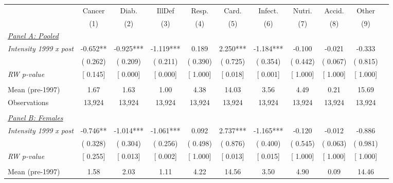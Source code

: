 \begin{tabular}{lcccccccccc} \hline \hline
& Cancer & Diab. & IllDef & Resp. & Card. & Infect. & Nutri. & Accid. & Other \\ 
\cmidrule(lr){2-2}\cmidrule(lr){3-3}\cmidrule(lr){4-4}\cmidrule(lr){5-5}\cmidrule(lr){6-6}\cmidrule(lr){7-7}\cmidrule(lr){8-8}\cmidrule(lr){9-9}\cmidrule(lr){10-10}
& \multicolumn{1}{c}{(1)} & \multicolumn{1}{c}{(2)} & \multicolumn{1}{c}{(3)} & \multicolumn{1}{c}{(4)} & \multicolumn{1}{c}{(5)} & \multicolumn{1}{c}{(6)} & \multicolumn{1}{c}{(7)} & \multicolumn{1}{c}{(8)} & \multicolumn{1}{c}{(9)} \\ \toprule
\underline{\textit{Panel A: Pooled}}  \\ 
\textit{Intensity 1999 x post} &       -0.652** &       -0.925*** &       -1.119*** &        0.189 &        2.250*** &       -1.184*** &       -0.100 &       -0.021 &       -0.333 \\ 
 & (       0.262) & (       0.209) & (       0.211) & (       0.390) & (       0.725) & (       0.354) & (       0.442) & (       0.067) & (       0.815) \\ 
\textit{RW p-value} & [ 0.145] & [ 0.000] & [ 0.000] & [ 1.000] & [ 0.018] & [ 0.001] & [ 1.000] & [ 1.000] & [ 1.000] \\ 
  & & & & & & & & & \\ 
Mean (pre-1997) &         1.67 &         1.63 &         1.00 &         4.38 &        14.03 &         3.56 &         4.49 &         0.21 &        15.69 \\ 
Observations &       13,924 &       13,924 &       13,924 &       13,924 &       13,924 &       13,924 &       13,924 &       13,924 &       13,924 \\ 
  & & & & & & & & & \\ 
\underline{\textit{Panel B: Females}}  \\ 
\textit{Intensity 1999 x post} &       -0.746** &       -1.014*** &       -1.061*** &        0.092 &        2.737*** &       -1.165*** &       -0.120 &       -0.012 &       -0.886 \\ 
 & (       0.328) & (       0.304) & (       0.256) & (       0.498) & (       0.876) & (       0.400) & (       0.545) & (       0.063) & (       0.981) \\ 
\textit{RW p-value} & [ 0.255] & [ 0.013] & [ 0.002] & [ 1.000] & [ 0.013] & [ 0.015] & [ 1.000] & [ 1.000] & [ 1.000] \\ 
  & & & & & & & & & \\ 
Mean (pre-1997) &         1.58 &         2.03 &         1.11 &         4.22 &        14.56 &         3.50 &         4.90 &         0.09 &        14.46 \\ 

\end{tabular}
